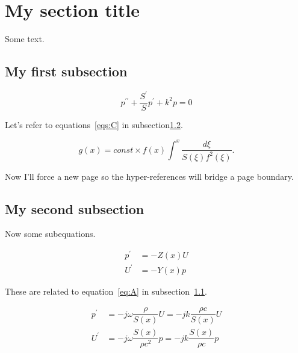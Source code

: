 \documentclass[reqno]{amsart}
\numberwithin{equation}{subsection}
\begin{document}
\section{My section title}

Some text.

\subsection{My first subsection}
\label{ss:first}

\begin{equation}
\label{eq:A}
p^{\prime\prime} + \dfrac{S^\prime}{S}p^\prime +k^2p = 0
\end{equation}

Let's refer to equations~\ref{eqs:C} in 
subsection\ref{ss:second}.

\begin{equation}
\label{eq:B}
g(x)=const \times f(x) \int^{x} \dfrac{d\xi}{S(\xi)f^{2}(\xi)} .
\end{equation}

Now I'll force a new page so the hyper-references will bridge a page
boundary.
\newpage

\subsection{My second subsection}
\label{ss:second}
Now some subequations.

\begin{subequations}
\label{eqs:C}
\begin{align}
p^\prime& = -Z(x)U \label{eq:pC} \\
U^\prime & = -Y(x)p \label{eq:UC}
\end{align}
\end{subequations}

These are related to equation~\ref{eq:A} in subsection~\ref{ss:first}.

{%
\begin{subequations}
\label{eqs:D}
\begin{align}
p^\prime& = -j \omega {\dfrac{\rho}{S(x)}}U
 = -jk {\dfrac{\rho c}{S(x)}}U \label{eq:pD} \\
U^\prime & = -j \omega {\dfrac{S(x)}{\rho c^{2}}}p
 = -jk {\dfrac{S(x)}{\rho c}}p \label{eq:UD}
\end{align}
\end{subequations}
}
\end{document}
